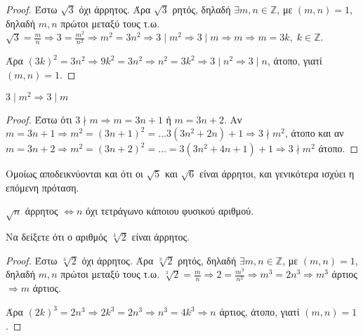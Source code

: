 \documentclass[main.tex]{subfiles}
\begin{document}
\begin{proof}
  Έστω $ \sqrt{3} $ όχι άρρητος. Άρα $ \sqrt{3} $ ρητός, δηλαδή $ \exists m,n 
  \in \mathbb{Z} $, με $ (m,n)=1 $, δηλαδή $ m,n $ πρώτοι μεταξύ τους
  τ.ω. $ \sqrt{3} = \frac{m}{n} \Rightarrow 3 = \frac{m^{2}}{n^{2}} \Rightarrow 
  m^{2} = 3n^{2} \Rightarrow 3 \mid m^{2} \Rightarrow 3 \mid m  \Rightarrow m 
  \Rightarrow m = 3k, \; k \in \mathbb{Z}$. 

  Άρα $ (3k)^{2} = 3n^{2} \Rightarrow 9k^{2}=3n^{2} \Rightarrow n^{2} = 3k^{2} 
  \Rightarrow 3 \mid n^{2} \Rightarrow  3 \mid n$,  άτοπο, γιατί $ (m,n)=1 $.
\end{proof}

\begin{lem}
  $ 3 \mid m^{2} \Rightarrow 3 \mid m $
\end{lem}

\begin{proof}
  Έστω ότι $ 3 \nmid m \Rightarrow m = 3n +1 $ ή $ m = 3n+2 $. 
  Αν $ m=3n+1 \Rightarrow m^{2} = (3n+1)^{2} = \ldots 3(3n^{2}+2n)+1 \Rightarrow 
  3 \nmid m^{2}$, άτοπο και αν $ m =3n+2 \Rightarrow m^{2}=(3n+2)^{2} = \ldots = 
  3(3n^{2}+4n+1)+1 \Rightarrow 3 \nmid m^{2}$ άτοπο.
\end{proof}

\begin{rem}
  Ομοίως αποδεικνύονται και ότι οι $ \sqrt{5}$ και  $ \sqrt{6} $ είναι άρρητοι, 
  και γενικότερα ισχύει η επόμενη πρόταση.
\end{rem}

\begin{mypropbox}
$ \sqrt{n} $ άρρητος $ \Leftrightarrow n $ όχι τετράγωνο κάποιου φυσικού αριθμού.
\end{mypropbox}

\begin{example}
  Να δείξετε ότι ο αριθμός $ \sqrt[3]{2} $ είναι άρρητος.
\end{example}

\begin{proof}
  Έστω $ \sqrt[3]{2} $ όχι άρρητος. Άρα $ \sqrt[3]{2} $ ρητός, δηλαδή $ \exists m,n 
  \in \mathbb{Z} $, με $ (m,n)=1 $, δηλαδή $ m,n $ πρώτοι μεταξύ τους
  τ.ω. $ \sqrt[3]{2} = \frac{m}{n} \Rightarrow 2 = \frac{m^{3}}{n^{3}} \Rightarrow 
  m^{3} = 2n^{3} \Rightarrow m^{3} $ άρτιος $ \Rightarrow m $ άρτιος. 

  Άρα $ (2k)^{3} = 2n^{3} \Rightarrow 2k^{3}=2n^{3} \Rightarrow n^{3} = 4k^{3} 
  \Rightarrow n $ άρτιος,  άτοπο, γιατί $ (m,n)=1 $.
\end{proof}
\end{document}
